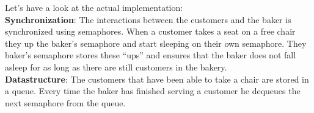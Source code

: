 \documentclass[11pt]{article}
\begin{document}
Let's have a look at the actual implementation:\\

\textbf{Synchronization}: The interactions between the customers and the baker is synchronized using semaphores. When a customer takes a seat on a free chair they up the baker's semaphore and start sleeping on their own semaphore. They baker's semaphore stores these ``ups'' and ensures that the baker does not fall asleep for as long as there are still customers in the bakery.\\

\textbf{Datastructure}: The customers that have been able to take a chair are stored in a queue. Every time the baker has finished serving a customer he dequeues the next semaphore from the queue.\\
\end{document}
